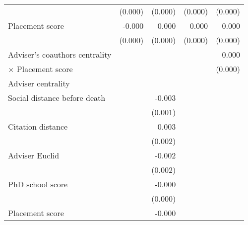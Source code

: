 {\begin{tabular}{l*{4}{D{.}{.}{-1}}}
                              	&        (0.000)         	&        (0.000)         	&        (0.000)         	&        (0.000)         \\
\addlinespace
Placement score               	&         -0.000\sym{**} 	&          0.000\sym{***}	&          0.000\sym{***}	&          0.000\sym{***}\\
                              	&        (0.000)         	&        (0.000)         	&        (0.000)         	&        (0.000)         \\
\addlinespace
Adviser's coauthors centrality	&                        	&                        	&                        	&          0.000\sym{**} \\
$\times$ Placement score      	&                        	&                        	&                        	&        (0.000)         \\
\midrule
Adviser centrality            	&                        	&                        	&                        	&                        \\
Social distance before death  	&                        	&         -0.003\sym{***}	&                        	&                        \\
                              	&                        	&        (0.001)         	&                        	&                        \\
\addlinespace
Citation distance             	&                        	&          0.003\sym{**} 	&                        	&                        \\
                              	&                        	&        (0.002)         	&                        	&                        \\
\addlinespace
Adviser Euclid                	&                        	&         -0.002         	&                        	&                        \\
                              	&                        	&        (0.002)         	&                        	&                        \\
\addlinespace
PhD school score              	&                        	&         -0.000         	&                        	&                        \\
                              	&                        	&        (0.000)         	&                        	&                        \\
\addlinespace
Placement score               	&                        	&         -0.000\sym{***}	&                        	&                        \\

\end{tabular}}
